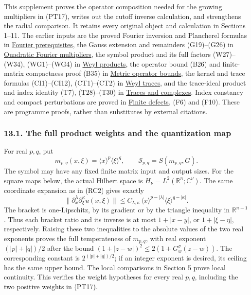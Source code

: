 \documentclass[
  11pt,
]{article}
\begin{document}
This supplement proves the operator composition needed for the growing
multipliers in (PT17), writes out the cutoff inverse calculation, and
strengthens the radial comparison. It retains every original object and
calculation in Sections 1--11. The earlier inputs are the proved Fourier
inversion and Plancherel formulas in
\href{prerequisite-bridges.pdf}{Fourier prerequisites}, the Gauss
extension and remainders (G19)--(G26) in
\href{gauss-transform-estimates.pdf\#section*.42}{Quadratic
Fourier multipliers}, the symbol product and its full factors
(W27)--(W34), (WG1)--(WG4) in
\href{weyl-metric-products.pdf\#section*.72}{Weyl
products}, the operator bound (B26) and finite-matrix compactness proof
(B35) in \href{metric-operator-bounds.pdf}{Metric operator bounds}, the
kernel and trace formulas (CI1)--(CI12), (CT1)--(CT2) in
\href{weyl-trace-criterion.pdf}{Weyl traces}, and the trace-ideal product
and index identity (T7), (T28)--(T30) in
\href{traces-and-complexes.pdf}{Traces and complexes}. Index constancy
and compact perturbations are proved in
\href{fredholm-stability.pdf\#section*.13}{Finite
defects}, (F6) and (F10). These are programme proofs, rather than
substitutes by external citations.

\subsubsection{13.1. The full product weights and the quantization
map}\label{the-full-product-weights-and-the-quantization-map}

For real \(p,q\), put \[
 m_{p,q}(x,\xi)=\langle x\rangle^p\langle\xi\rangle^q,\qquad
 \mathcal S_{p,q}=S(m_{p,q},G).
 \tag{RS1}
\] The symbol may have any fixed finite matrix input and output sizes.
For the square maps below, the actual Hilbert space is
\(H_\nu=L^2(\mathbb R^n;\mathbb C^\nu)\). The same coordinate expansion
as in (RC2) gives exactly \[
 \|\partial_x^\lambda\partial_\xi^\kappa u(x,\xi)\|
 \leq C_{\lambda,\kappa}\,
       \langle x\rangle^{p-|\lambda|}
       \langle\xi\rangle^{q-|\kappa|}.
 \tag{RS2}
\] The bracket is one-Lipschitz, by its gradient or by the triangle
inequality in \(\mathbb R^{n+1}\). Thus each bracket ratio and its
inverse is at most \(1+|x-y|\), or \(1+|\xi-\eta|\), respectively.
Raising these two inequalities to the absolute values of the two real
exponents proves the full temperateness of \(m_{p,q}\), with real
exponent \((|p|+|q|)/2\) after the bound
\((1+|z-w|)^2\leq2(1+G_w^\sigma(z-w))\). The corresponding constant is
\(2^{(|p|+|q|)/2}\); if an integer exponent is desired, its ceiling has
the same upper bound. The local comparisons in Section 5 prove local
continuity. This verifies the weight hypotheses for every real \(p,q\),
including the two positive weights in (PT17).
\end{document}
